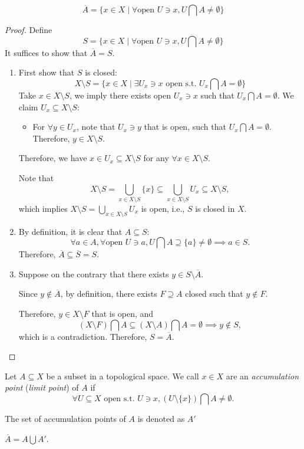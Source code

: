 \begin{proposition}
\[
\overline{A}=\{x\in X\mid\forall \text{open }U\ni x, U\bigcap A\ne\emptyset\}
\]
\end{proposition}
\begin{proof}
Define
\[
S=\{x\in X\mid\forall \text{open }U\ni x, U\bigcap A\ne\emptyset\}
\]
It suffices to show that $\overline{A}=S$.
\begin{enumerate}
\item
First show that $S$ is closed:
\[
X\setminus S=\{x\in X\mid\exists U_x\ni x\text{ open s.t. }U_x\bigcap A=\emptyset\}
\]
Take $x\in X\setminus S$, we imply there exists open $U_x\ni x$ such that $U_x\bigcap A=\emptyset$. We claim $U_x\subseteq X\setminus S$:
\begin{itemize}
\item
For $\forall y\in U_x$, note that $U_x\ni y$ that is open, such that $U_x\bigcap A=\emptyset$. Therefore, $y\in X\setminus S$.
\end{itemize}

Therefore, we have $x\in U_x\subseteq X\setminus S$ for any $\forall x\in X\setminus S$.

Note that
\[
X\setminus S
=
\bigcup_{x\in X\setminus S}\{x\}\subseteq
\bigcup_{x\in X\setminus S}U_x\subseteq X\setminus S,
\]
which implies $X\setminus S=\bigcup_{x\in X\setminus S}U_x$ is open, i.e., $S$ is closed in $X$.
\item
By definition, it is clear that $A\subseteq S$:
\[
\forall a\in A,\forall\text{open }U\ni a,
U\bigcap A\supseteq\{a\}\ne\emptyset\implies a\in S.
\]
Therefore, $\overline{A}\subseteq\overline{S}=S$.
\item
Suppose on the contrary that 
there exists $y\in S\setminus\overline{A}$. 

Since $y\notin\overline{A}$, by definition, 
there exists $F\supseteq A$ closed such that 
$y\notin F$. 

Therefore, $y\in X\setminus F$ that is open, and 
\[
(X\setminus F)\bigcap A\subseteq(X\setminus A)\bigcap A=\emptyset\implies y\notin S,
\]
which is a contradiction. Therefore, $S=\overline{A}$.
\end{enumerate}
\end{proof}
\begin{definition}
Let $A\subseteq X$ be a subset in a topological space. 
We call $x\in X$ are an 
\emph{accumulation point} (\emph{limit point}) of $A$ 
if
\[
\forall U\subseteq X\text{ open s.t. }
U\ni x, 
(U\setminus\{x\})\bigcap A\ne\emptyset.
\]

The set of accumulation points of $A$ is denoted as $A'$
\end{definition}
\begin{proposition}
$\overline{A}=A\bigcup A'$.
\end{proposition}












